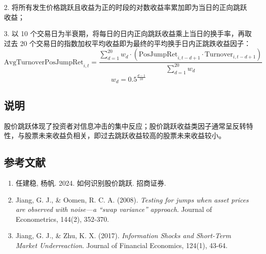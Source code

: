 \documentclass{article}
\begin{document}
2. 将所有发生价格跳跃且收益为正的时段的对数收益率累加即为当日的正向跳跃收益；

3. 以 10 个交易日为半衰期，将每日的日内正向跳跃收益乘上当日的换手率，再取过去 20 个交易日的指数加权平均收益即为最终的平均换手日内正跳跌收益因子：
\begin{equation}
    \mathrm{AvgTurnoverPosJumpRet}_{i,t} = \frac{\sum_{d=1}^{20} w_d \cdot (\mathrm{PosJumpRet}_{i,t-d+1} \cdot \mathrm{Turnover}_{i,t-d+1})}{\sum_{d=1}^{20} w_d}
\end{equation}
\begin{equation}
    w_d = 0.5^{\frac{d-1}{10}}
\end{equation}

\subsection{说明}
股价跳跃体现了投资者对信息冲击的集中反应；股价跳跃收益类因子通常呈反转特性，与股票未来收益负相关，即过去跳跃收益较高的股票未来收益较小。

\subsection{参考文献}
\begin{enumerate}
    \item 任建稳, 杨帆. 2024. 如何识别股价跳跃. 招商证券.
    \item Jiang, G. J., \& Oomen, R. C. A. (2008). \textit{Testing for jumps when asset prices are observed with noise—a “swap variance” approach}. Journal of Econometrics, 144(2), 352-370.
    \item Jiang, G. J., \& Zhu, K. X. (2017). \textit{Information Shocks and Short-Term Market Underreaction}. Journal of Financial Economics, 124(1), 43-64.
\end{enumerate}
\end{document}
